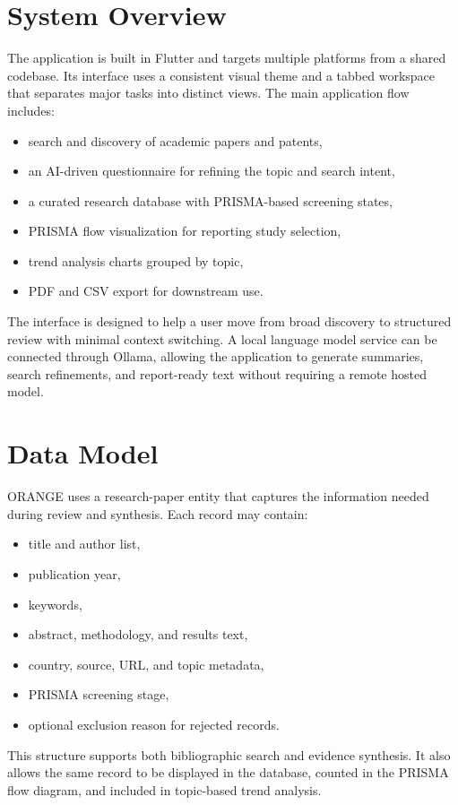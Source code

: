 \documentclass[11pt,a4paper]{article}
\begin{document}
\section{System Overview}
The application is built in Flutter and targets multiple platforms from a shared codebase. Its interface uses a consistent visual theme and a tabbed workspace that separates major tasks into distinct views. The main application flow includes:
\begin{itemize}[leftmargin=1.2em]
  \item search and discovery of academic papers and patents,
  \item an AI-driven questionnaire for refining the topic and search intent,
  \item a curated research database with PRISMA-based screening states,
  \item PRISMA flow visualization for reporting study selection,
  \item trend analysis charts grouped by topic,
  \item PDF and CSV export for downstream use.
\end{itemize}

The interface is designed to help a user move from broad discovery to structured review with minimal context switching. A local language model service can be connected through Ollama, allowing the application to generate summaries, search refinements, and report-ready text without requiring a remote hosted model.

\section{Data Model}
ORANGE uses a research-paper entity that captures the information needed during review and synthesis. Each record may contain:
\begin{itemize}[leftmargin=1.2em]
  \item title and author list,
  \item publication year,
  \item keywords,
  \item abstract, methodology, and results text,
  \item country, source, URL, and topic metadata,
  \item PRISMA screening stage,
  \item optional exclusion reason for rejected records.
\end{itemize}

This structure supports both bibliographic search and evidence synthesis. It also allows the same record to be displayed in the database, counted in the PRISMA flow diagram, and included in topic-based trend analysis.
\end{document}
